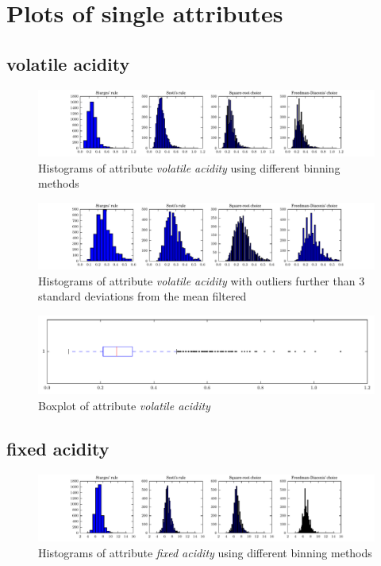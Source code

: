 \documentclass{report}
\begin{document}
\section{Plots of single attributes}

\subsection{volatile acidity}
\begin{figure}[H]
\includegraphics[width=\textwidth]{histograms/volatile_acidity.pdf}
\caption{Histograms of attribute \emph{volatile acidity} using different binning methods}\end{figure}

\begin{figure}[H]
\includegraphics[width=\textwidth]{histograms/volatile_acidity_filtered.pdf}
\caption{Histograms of attribute \emph{volatile acidity} with outliers further than 3 standard deviations from the mean filtered}\n\end{figure}

\begin{figure}[H]
\includegraphics[width=\textwidth]{boxplots/volatile_acidity.pdf}
\caption{Boxplot of attribute \emph{volatile acidity}}\end{figure}

\newpage\subsection{fixed acidity}
\begin{figure}[H]
\includegraphics[width=\textwidth]{histograms/fixed_acidity.pdf}
\caption{Histograms of attribute \emph{fixed acidity} using different binning methods}\end{figure}
\end{document}
